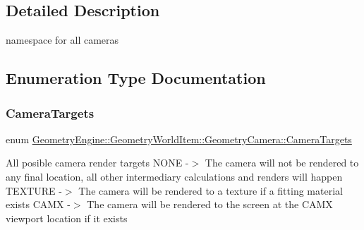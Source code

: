 \subsection{Detailed Description}
namespace for all cameras 

\subsection{Enumeration Type Documentation}
\mbox{\label{namespace_geometry_engine_1_1_geometry_world_item_1_1_geometry_camera_a3766848bae97ff8203fa26907ac359ef}} 
\subsubsection{\texorpdfstring{CameraTargets}{CameraTargets}}
{\footnotesize\ttfamily enum \mbox{\hyperlink{namespace_geometry_engine_1_1_geometry_world_item_1_1_geometry_camera_a3766848bae97ff8203fa26907ac359ef}{Geometry\+Engine\+::\+Geometry\+World\+Item\+::\+Geometry\+Camera\+::\+Camera\+Targets}}}

All posible camera render targets N\+O\+NE -\/$>$ The camera will not be rendered to any final location, all other intermediary calculations and renders will happen T\+E\+X\+T\+U\+RE -\/$>$ The camera will be rendered to a texture if a fitting material exists C\+A\+MX -\/$>$ The camera will be rendered to the screen at the C\+A\+MX viewport location if it exists 